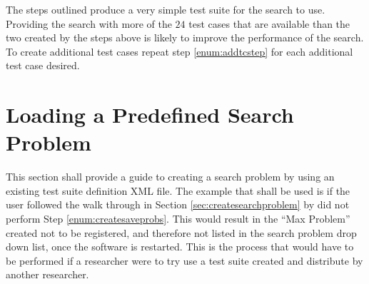 The steps outlined produce a very simple test suite for the search to use.
Providing the search with more of the $24$ test cases that are available than the two created by the steps above is likely to improve the performance of the search.
To create additional test cases repeat step \ref{enum:addtcstep} for each additional test case desired.

\section{Loading a Predefined Search Problem}
This section shall provide a guide to creating a search problem by using an existing test suite definition XML file.
The example that shall be used is if the user followed the walk through in Section \ref{sec:createsearchproblem} by did not perform Step \ref{enum:createsaveprobs}.
This would result in the ``Max Problem'' created not to be registered, and therefore not listed in the search problem drop down list, once the software is restarted.
This is the process that would have to be performed if a researcher were to try use a test suite created and distribute by another researcher.

